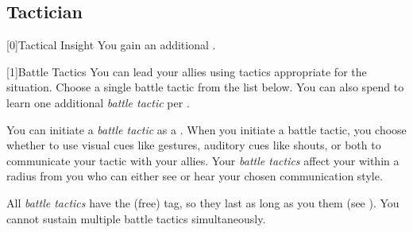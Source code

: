     \newpage
    \subsection{Tactician}

        [0]{Tactical Insight} You gain an additional .

        [1]{Battle Tactics}
        You can lead your allies using tactics appropriate for the situation.
        Choose a single battle tactic from the list below.
        You can also spend  to learn one additional \textit{battle tactic} per .

        You can initiate a \textit{battle tactic} as a .
        When you initiate a battle tactic, you choose whether to use visual cues like gestures, auditory cues like shouts, or both to communicate your tactic with your allies.
        Your \textit{battle tactics} affect your  within a \areahuge radius  from you who can either see or hear your chosen communication style.

        All \textit{battle tactics} have the  (free) tag, so they last as long as you  them (see ).
        You cannot sustain multiple battle tactics simultaneously.

